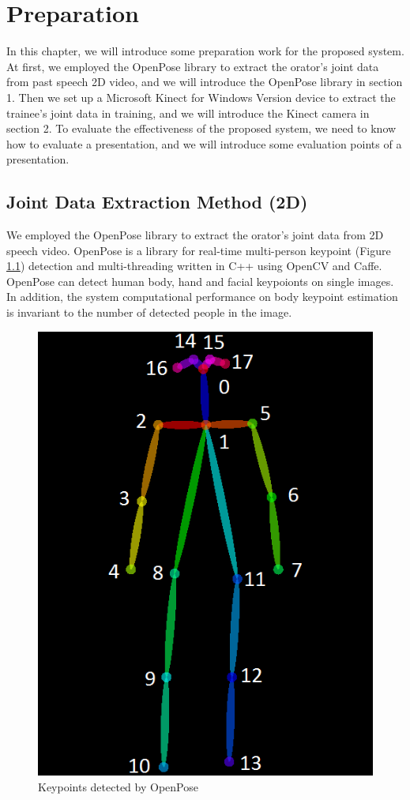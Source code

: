 \chapter{Preparation}
\par In this chapter, we will introduce some preparation work for the proposed system. At first, we employed the OpenPose library\cite{cao2017realtime} to extract the orator's joint data from past speech 2D video, and we will introduce the OpenPose library in section 1. Then we set up a Microsoft Kinect for Windows Version device\cite{Shotton2011} to extract the trainee's joint data in training, and we will introduce the Kinect camera in section 2. To evaluate the effectiveness of the proposed system, we need to know how to evaluate a presentation, and we will introduce some evaluation points of a presentation.
\section{Joint Data Extraction Method (2D)}
We employed the OpenPose library to extract the orator's joint data from 2D speech video\cite{cao2017realtime}. OpenPose is a library for real-time multi-person keypoint (Figure \ref{fig:Keypoints detected by OpenPose}) detection and multi-threading written in C++ using OpenCV and Caffe\cite{Jia2014}. OpenPose can detect human body, hand and facial keypoionts on single images. In addition, the system computational performance on body keypoint estimation is invariant to the number of detected people in the image.
\begin{figure}[htbp]
\centering\includegraphics[scale=0.55]{./img/keypoints_openpose.png}
\caption{Keypoints detected by OpenPose}\label{fig:Keypoints detected by OpenPose}
\end{figure}

